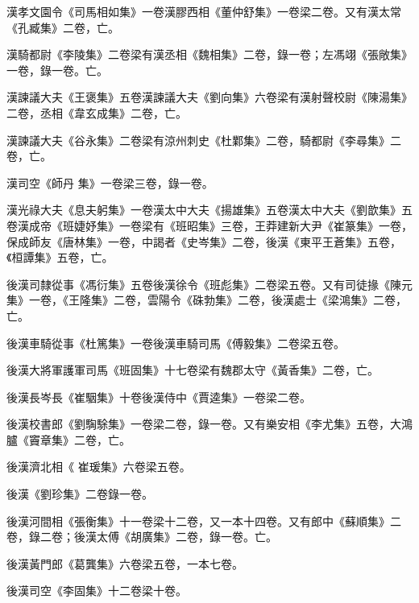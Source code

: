 \begin{pinyinscope}
 漢孝文園令《司馬相如集》一卷漢膠西相《董仲舒集》一卷梁二卷。又有漢太常《孔臧集》二卷，亡。



 漢騎都尉《李陵集》二卷梁有漢丞相《魏相集》二卷，錄一卷；左馮翊《張敞集》一卷，錄一卷。亡。



 漢諫議大夫《王褒集》五卷漢諫議大夫《劉向集》六卷梁有漢射聲校尉《陳湯集》二卷，丞相《韋玄成集》二卷，亡。



 漢諫議大夫《谷永集》二卷梁有涼州刺史《杜鄴集》二卷，騎都尉《李尋集》二卷，亡。



 漢司空《師丹
 集》一卷梁三卷，錄一卷。



 漢光祿大夫《息夫躬集》一卷漢太中大夫《揚雄集》五卷漢太中大夫《劉歆集》五卷漢成帝《班婕妤集》一卷梁有《班昭集》三卷，王莽建新大尹《崔篆集》一卷，保成師友《唐林集》一卷，中謁者《史岑集》二卷，後漢《東平王蒼集》五卷，《桓譚集》五卷，亡。



 後漢司隸從事《馮衍集》五卷後漢徐令《班彪集》二卷梁五卷。又有司徒掾《陳元集》一卷，《王隆集》二卷，雲陽令《硃勃集》二卷，後漢處士《梁鴻集》二卷，亡。



 後漢車騎從事《杜篤集》一卷後漢車騎司馬《傅毅集》二卷梁五卷。



 後漢大將軍護軍司馬《班固集》十七卷梁有魏郡太守《黃香集》二卷，亡。



 後漢長岑長《崔駰集》十卷後漢侍中《賈逵集》一卷梁二卷。



 後漢校書郎《劉騊駼集》一卷梁二卷，錄一卷。又有樂安相《李尤集》五卷，大鴻臚《竇章集》二卷，亡。



 後漢濟北相《
 崔瑗集》六卷梁五卷。



 後漢《劉珍集》二卷錄一卷。



 後漢河間相《張衡集》十一卷梁十二卷，又一本十四卷。又有郎中《蘇順集》二卷，錄二卷；後漢太傅《胡廣集》二卷，錄一卷。亡。



 後漢黃門郎《葛龔集》六卷梁五卷，一本七卷。



 後漢司空《李固集》十二卷梁十卷。




\end{pinyinscope}
